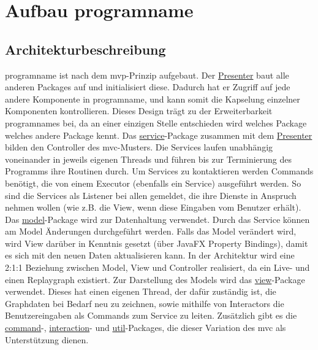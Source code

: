 \chapter{Aufbau \gls{programname}}
\label{ch:aufbau_programname}

\section{Architekturbeschreibung}

\gls{programname} ist nach dem \gls{mvp}-Prinzip aufgebaut. Der
\hyperref[subsec:presenter]{Presenter} baut alle anderen Packages auf und
initialisiert diese. Dadurch hat er Zugriff auf jede andere Komponente in \gls{programname},
und kann somit die Kapselung einzelner Komponenten kontrollieren. Dieses Design
trägt zu der Erweiterbarkeit \gls{programname}s bei, da an einer einzigen
Stelle entschieden wird welches Package welches andere Package kennt.
\newline
\newline
Das \hyperref[subsec:service]{service}-Package zusammen mit dem \hyperref[subsec:presenter]{Presenter}
bilden den Controller des \gls{mvc}-Musters. Die Services laufen unabhängig voneinander in
jeweils eigenen Threads und führen bis zur Terminierung des Programms ihre Routinen durch.
Um Services zu kontaktieren werden Commands benötigt, die von einem Executor (ebenfalls ein
Service) ausgeführt werden. So sind die Services als Listener bei allen gemeldet, die ihre
Dienste in Anspruch nehmen wollen (wie z.B. die View, wenn diese Eingaben vom Benutzer erhält).
\newline
\newline
Das \hyperref[subsec:model]{model}-Package wird zur Datenhaltung verwendet. Durch das Service
können am Model Änderungen durchgeführt werden. Falls das Model verändert wird, wird View
darüber in Kenntnis gesetzt (über JavaFX Property Bindings), damit es sich mit den neuen Daten
aktualisieren kann. In der Architektur wird eine 2:1:1 Beziehung zwischen Model,
View und Controller realisiert, da ein Live- und einen Replaygraph existiert.
\newline
\newline
Zur Darstellung des Models wird das \hyperref[subsec:view]{view}-Package verwendet. Dieses
hat einen eigenen Thread, der dafür zuständig ist, die Graphdaten bei Bedarf neu zu zeichnen,
sowie mithilfe von Interactors die Benutzereingaben als Commands zum Service zu leiten.
\newline
\newline
Zusätzlich gibt es die \hyperref[subsec:command]{command}-, \hyperref[subsec:interaction]{interaction}-
und \hyperref[subsec:util]{util}-Packages, die dieser Variation des \gls{mvc} als Unterstützung dienen.


